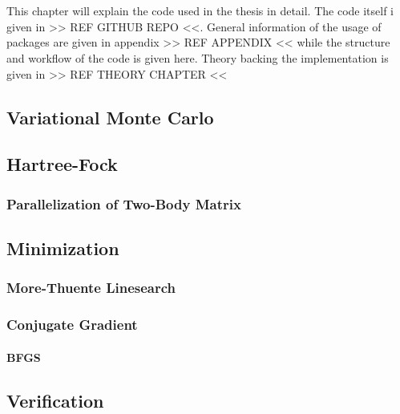 \chapter{\label{chapter:5}}
    This chapter will explain the code used in the thesis in detail. The code
    itself i given in >> REF GITHUB REPO <<. General information of the usage
    of packages are given in appendix >> REF APPENDIX << while the structure
    and workflow of the code is given here. Theory backing the implementation
    is given in >> REF THEORY CHAPTER <<

\section{Variational Monte Carlo}
\section{Hartree-Fock}
\subsection{Parallelization of Two-Body Matrix}
\section{Minimization}
\subsection{More-Thuente Linesearch}
\subsection{Conjugate Gradient}
\subsubsection{BFGS}
\section{Verification}
